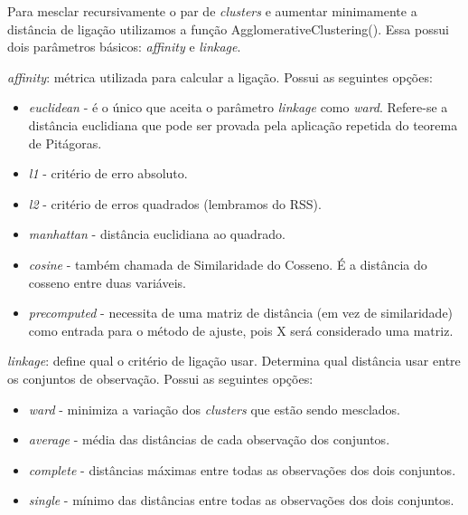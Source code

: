 Para mesclar recursivamente o par de \textit{clusters} e aumentar minimamente a distância de ligação utilizamos a função AgglomerativeClustering(). Essa possui dois parâmetros básicos: \textit{affinity} e \textit{linkage}.

\textit{affinity}: métrica utilizada para calcular a ligação. Possui as seguintes opções:
\begin{itemize}[nolistsep]
	\item \textit{euclidean} - é o único que aceita o parâmetro \textit{linkage} como \textit{ward}. Refere-se a distância euclidiana que pode ser provada pela aplicação repetida do teorema de Pitágoras.
	\item \textit{l1} - critério de erro absoluto.
	\item \textit{l2} - critério de erros quadrados (lembramos do RSS).
	\item \textit{manhattan} - distância euclidiana ao quadrado.
	\item \textit{cosine} - também chamada de Similaridade do Cosseno. É a distância do cosseno entre duas variáveis.
	\item \textit{precomputed} - necessita de uma matriz de distância (em vez de similaridade) como entrada para o método de ajuste, pois X será considerado uma matriz.
\end{itemize}

\textit{linkage}: define qual o critério de ligação usar. Determina qual distância usar entre os conjuntos de observação. Possui as seguintes opções:
\begin{itemize}[nolistsep]
	\item \textit{ward} - minimiza a variação dos \textit{clusters} que estão sendo mesclados.
	\item \textit{average} - média das distâncias de cada observação dos conjuntos.
	\item \textit{complete} - distâncias máximas entre todas as observações dos dois conjuntos.
	\item \textit{single} - mínimo das distâncias entre todas as observações dos dois conjuntos.
\end{itemize}

